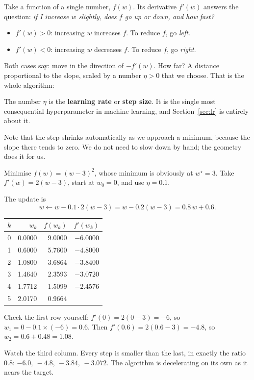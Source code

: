 \documentclass[11pt]{article}
\begin{document}
Take a function of a single number, $f(w)$. Its derivative $f'(w)$ answers the
question: \emph{if I increase $w$ slightly, does $f$ go up or down, and how
fast?}

\begin{itemize}[leftmargin=*]
  \item $f'(w) > 0$: increasing $w$ increases $f$. To reduce $f$, go
    \emph{left}.
  \item $f'(w) < 0$: increasing $w$ decreases $f$. To reduce $f$, go
    \emph{right}.
\end{itemize}

Both cases say: move in the direction of $-f'(w)$. How far? A distance
proportional to the slope, scaled by a number $\eta > 0$ that we choose. That
is the whole algorithm:

\begin{center}
\end{center}

The number $\eta$ is the \textbf{learning rate} or \textbf{step size}. It is
the single most consequential hyperparameter in machine learning, and
Section~\ref{sec:lr} is entirely about it.

Note that the step shrinks automatically as we approach a minimum, because the
slope there tends to zero. We do not need to slow down by hand; the geometry
does it for us.

\begin{worked}
Minimise $f(w) = (w-3)^2$, whose minimum is obviously at $w^\star = 3$. Take
$f'(w) = 2(w-3)$, start at $w_0 = 0$, and use $\eta = 0.1$.

The update is
\[
  w \leftarrow w - 0.1 \cdot 2(w-3) = w - 0.2(w-3) = 0.8\,w + 0.6 .
\]

\begin{center}
\begin{tabular}{@{}rrrr@{}}
\toprule
$k$ & $w_k$ & $f(w_k)$ & $f'(w_k)$\\
\midrule
0 & 0.0000 & 9.0000 & $-6.0000$\\
1 & 0.6000 & 5.7600 & $-4.8000$\\
2 & 1.0800 & 3.6864 & $-3.8400$\\
3 & 1.4640 & 2.3593 & $-3.0720$\\
4 & 1.7712 & 1.5099 & $-2.4576$\\
5 & 2.0170 & 0.9664 & \\
\bottomrule
\end{tabular}
\end{center}

Check the first row yourself: $f'(0) = 2(0-3) = -6$, so
$w_1 = 0 - 0.1 \times (-6) = 0.6$. Then $f'(0.6) = 2(0.6-3) = -4.8$, so
$w_2 = 0.6 + 0.48 = 1.08$.

Watch the third column. Every step is smaller than the last, in exactly the
ratio $0.8$: $-6.0,\ -4.8,\ -3.84,\ -3.072$. The algorithm is decelerating on
its own as it nears the target.
\end{worked}
\end{document}
